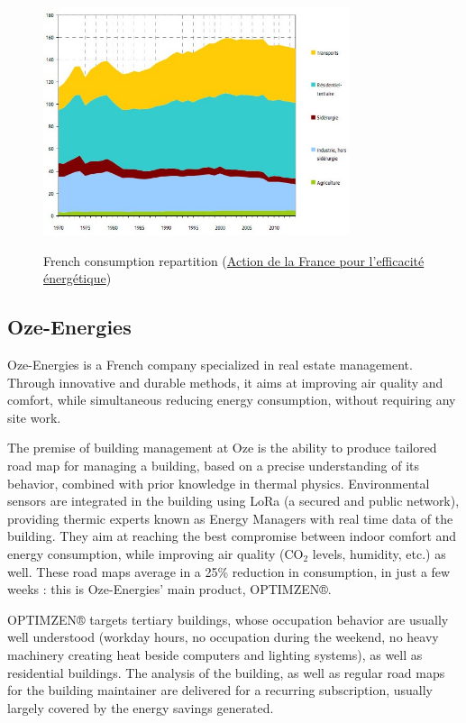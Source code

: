 \documentclass[12pt]{article}
\begin{document}
\begin{figure}
    \caption{French consumption repartition (\href{https://www.ecologie.gouv.fr/action-france-lefficacite-energetique}{Action de la France pour l’efficacité énergétique})}
    \centering
    \includegraphics[width=0.8\textwidth]{consumption_evolution_1970_2015.jpg}
    \label{fig:consumption_repartition}
\end{figure}

\subsection{Oze-Energies}

Oze-Energies is a French company specialized in real estate management. Through innovative and durable methods, it aims at improving air quality and comfort, while simultaneous reducing energy consumption, without requiring any site work.

The premise of building management at Oze is the ability to produce tailored road map for managing a building, based on a precise understanding of its behavior, combined with prior knowledge in thermal physics. Environmental sensors are integrated in the building using LoRa (a secured and public network), providing thermic experts known as Energy Managers with real time data of the building. They aim at reaching the best compromise between indoor comfort and energy consumption, while improving air quality (\ensuremath{\mathrm{CO_2}} levels, humidity, etc.) as well. These road maps average in a 25\% reduction in consumption, in just a few weeks : this is Oze-Energies' main product, OPTIMZEN®.

OPTIMZEN® targets tertiary buildings, whose occupation behavior are usually well understood (workday hours, no occupation during the weekend, no heavy machinery creating heat beside computers and lighting systems), as well as residential buildings. The analysis of the building, as well as regular road maps for the building maintainer are delivered for a recurring subscription, usually largely covered by the energy savings generated.
\end{document}
